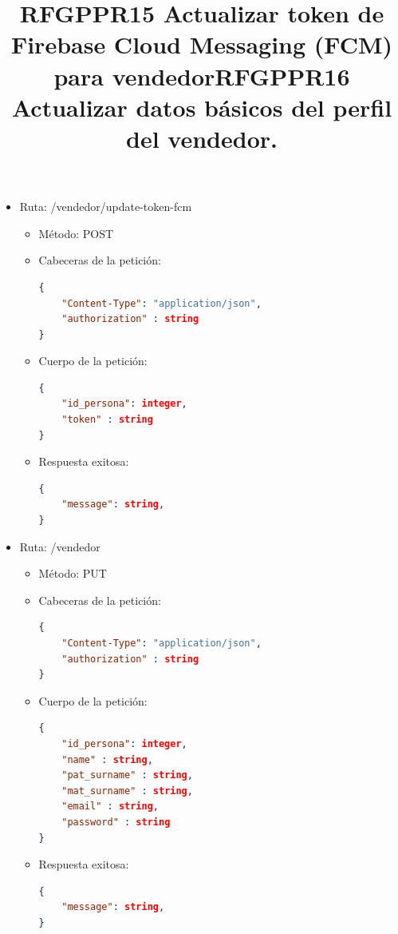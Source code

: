 \title{\textbf{RFGPPR15 Actualizar token de Firebase Cloud Messaging (FCM) para vendedor}}
\begin{itemize}
\item Ruta: /vendedor/update-token-fcm
\begin{itemize}
\item Método: POST
\item Cabeceras de la petición: 
\begin{lstlisting}[language=json,firstnumber=1]
{
	"Content-Type": "application/json",
	"authorization" : string
}
\end{lstlisting}	
\item Cuerpo de la petición: 
\begin{lstlisting}[language=json,firstnumber=1]
{
	"id_persona": integer,
	"token" : string
}
\end{lstlisting}
\item Respuesta exitosa: 
\begin{lstlisting}[language=json,firstnumber=1]
{
	"message": string,
}
\end{lstlisting}
\end{itemize}
\end{itemize}


\title{\textbf{RFGPPR16 Actualizar datos básicos del perfil del vendedor.}}
\begin{itemize}
\item Ruta: /vendedor
\begin{itemize}
\item Método: PUT
\item Cabeceras de la petición: 
\begin{lstlisting}[language=json,firstnumber=1]
{
	"Content-Type": "application/json",
	"authorization" : string
}
\end{lstlisting}
\item Cuerpo de la petición: 
\begin{lstlisting}[language=json,firstnumber=1]
{
	"id_persona": integer,
	"name" : string,
	"pat_surname" : string,
	"mat_surname" : string,
	"email" : string,
	"password" : string
}
\end{lstlisting}
\item Respuesta exitosa: 
\begin{lstlisting}[language=json,firstnumber=1]
{
	"message": string,
}
\end{lstlisting}
\end{itemize}
\end{itemize}


